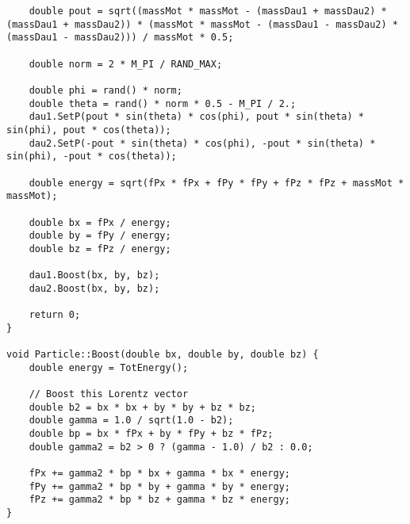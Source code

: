 \documentclass{article}
\begin{document}
\begin{verbatim}
    double pout = sqrt((massMot * massMot - (massDau1 + massDau2) * (massDau1 + massDau2)) * (massMot * massMot - (massDau1 - massDau2) * (massDau1 - massDau2))) / massMot * 0.5;

    double norm = 2 * M_PI / RAND_MAX;

    double phi = rand() * norm;
    double theta = rand() * norm * 0.5 - M_PI / 2.;
    dau1.SetP(pout * sin(theta) * cos(phi), pout * sin(theta) * sin(phi), pout * cos(theta));
    dau2.SetP(-pout * sin(theta) * cos(phi), -pout * sin(theta) * sin(phi), -pout * cos(theta));

    double energy = sqrt(fPx * fPx + fPy * fPy + fPz * fPz + massMot * massMot);

    double bx = fPx / energy;
    double by = fPy / energy;
    double bz = fPz / energy;

    dau1.Boost(bx, by, bz);
    dau2.Boost(bx, by, bz);

    return 0;
}

void Particle::Boost(double bx, double by, double bz) {
    double energy = TotEnergy();

    // Boost this Lorentz vector
    double b2 = bx * bx + by * by + bz * bz;
    double gamma = 1.0 / sqrt(1.0 - b2);
    double bp = bx * fPx + by * fPy + bz * fPz;
    double gamma2 = b2 > 0 ? (gamma - 1.0) / b2 : 0.0;

    fPx += gamma2 * bp * bx + gamma * bx * energy;
    fPy += gamma2 * bp * by + gamma * by * energy;
    fPz += gamma2 * bp * bz + gamma * bz * energy;
}
\end{verbatim}
\end{document}

